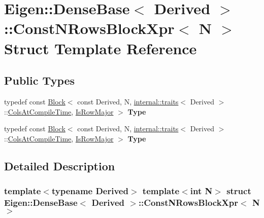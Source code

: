 \hypertarget{struct_eigen_1_1_dense_base_1_1_const_n_rows_block_xpr}{}\section{Eigen\+:\+:Dense\+Base$<$ Derived $>$\+:\+:Const\+N\+Rows\+Block\+Xpr$<$ N $>$ Struct Template Reference}
\label{struct_eigen_1_1_dense_base_1_1_const_n_rows_block_xpr}
\subsection*{Public Types}
\begin{DoxyCompactItemize}
\item 
\mbox{\label{struct_eigen_1_1_dense_base_1_1_const_n_rows_block_xpr_a96665a20b6e74d4beda0751074afd6fd}} 
typedef const \hyperlink{group___core___module_class_eigen_1_1_block}{Block}$<$ const Derived, N, \hyperlink{struct_eigen_1_1internal_1_1traits}{internal\+::traits}$<$ Derived $>$\+::\hyperlink{group___core___module_a9784b8701c2d1c79fa8000e1b3ebdb8bac1b474fd08671c39df677c4acdbc8df0}{Cols\+At\+Compile\+Time}, \hyperlink{group___core___module_a9784b8701c2d1c79fa8000e1b3ebdb8baff2add9b7e8426ba05be33f32806d21c}{Is\+Row\+Major} $>$ {\bfseries Type}
\item 
\mbox{\label{struct_eigen_1_1_dense_base_1_1_const_n_rows_block_xpr_a96665a20b6e74d4beda0751074afd6fd}} 
typedef const \hyperlink{group___core___module_class_eigen_1_1_block}{Block}$<$ const Derived, N, \hyperlink{struct_eigen_1_1internal_1_1traits}{internal\+::traits}$<$ Derived $>$\+::\hyperlink{group___core___module_a9784b8701c2d1c79fa8000e1b3ebdb8bac1b474fd08671c39df677c4acdbc8df0}{Cols\+At\+Compile\+Time}, \hyperlink{group___core___module_a9784b8701c2d1c79fa8000e1b3ebdb8baff2add9b7e8426ba05be33f32806d21c}{Is\+Row\+Major} $>$ {\bfseries Type}
\end{DoxyCompactItemize}


\subsection{Detailed Description}
\subsubsection*{template$<$typename Derived$>$\newline
template$<$int N$>$\newline
struct Eigen\+::\+Dense\+Base$<$ Derived $>$\+::\+Const\+N\+Rows\+Block\+Xpr$<$ N $>$}



